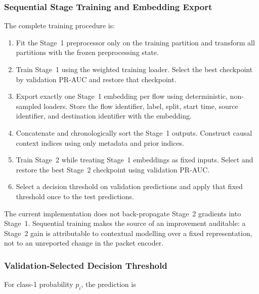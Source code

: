 \subsubsection{Sequential Stage Training and Embedding Export}
\label{subsubsec:sequential_training}

The complete training procedure is:

\begin{enumerate}[label=\textbf{Step \arabic*:},leftmargin=*]
    \item Fit the Stage~1 preprocessor only on the training partition and
    transform all partitions with the frozen preprocessing state.

    \item Train Stage~1 using the weighted training loader. Select the best
    checkpoint by validation PR-AUC and restore that checkpoint.

    \item Export exactly one Stage~1 embedding per flow using deterministic,
    non-sampled loaders. Store the flow identifier, label, split, start time,
    source identifier, and destination identifier with the embedding.

    \item Concatenate and chronologically sort the Stage~1 outputs. Construct
    causal context indices using only metadata and prior indices.

    \item Train Stage~2 while treating Stage~1 embeddings as fixed inputs.
    Select and restore the best Stage~2 checkpoint using validation PR-AUC.

    \item Select a decision threshold on validation predictions and apply that
    fixed threshold once to the test predictions.
\end{enumerate}

The current implementation does not back-propagate Stage~2 gradients into
Stage~1. Sequential training makes the source of an improvement auditable: a
Stage~2 gain is attributable to contextual modelling over a fixed representation,
not to an unreported change in the packet encoder.

\subsubsection{Validation-Selected Decision Threshold}
\label{subsubsec:decision_threshold}

For class-1 probability $p_i$, the prediction is

